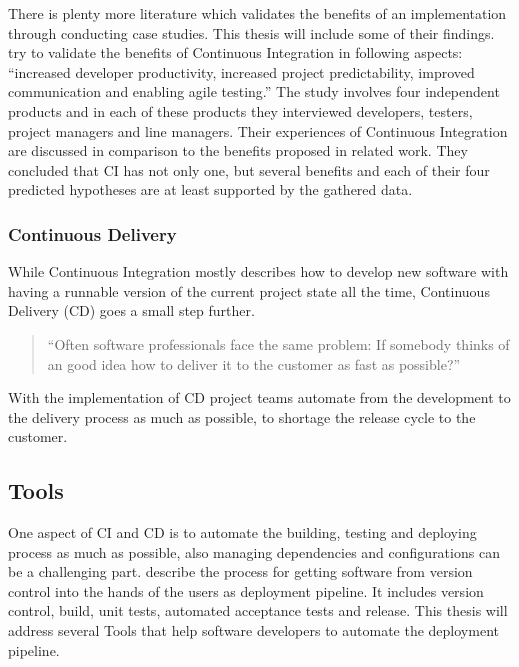 \bigskip

\noindent There is plenty more literature which validates the benefits of an implementation through conducting case studies. This thesis will include some of their findings. \textcite{Stahl2013} try to validate the benefits of Continuous Integration in following aspects: ``increased developer productivity, increased project predictability, improved communication and enabling agile testing.'' The study involves four independent products and in each of these products they interviewed developers, testers, project managers and line managers. Their experiences of Continuous Integration are discussed in comparison to the benefits proposed in related work. 
They concluded that CI has not only one, but several benefits and each of their four predicted hypotheses are at least supported by the gathered data.
 
\subsubsection*{Continuous Delivery}

While Continuous Integration mostly describes how to develop new software with having a runnable version of the current project state all the time, Continuous Delivery (CD) goes a small step further. 

\begin{quote}
``Often software professionals face the same problem: If somebody thinks of an good idea how to deliver it to the customer as fast as possible?''  \autocite{Humble2010}
\end{quote}

\noindent With the implementation of CD project teams automate from the development to the delivery process as much as possible, to shortage the release cycle to the customer.
 
\subsection*{Tools}
One aspect of CI and CD is to automate the building, testing and deploying process as much as possible, also managing dependencies and configurations can be a challenging part. \textcite{Humble2010} describe the process for getting software from version control into the hands of the users as deployment pipeline. It includes version control, build, unit tests, automated acceptance tests and release. This thesis will address several Tools that help software developers to automate the deployment pipeline.
 

